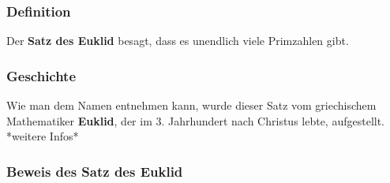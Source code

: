 \subsubsection{Definition}
Der \textbf{Satz des Euklid} besagt, dass es unendlich viele Primzahlen gibt.
\subsubsection{Geschichte}
Wie man dem Namen entnehmen kann, wurde dieser Satz vom griechischem Mathematiker \textbf{Euklid}, der im 3. Jahrhundert nach Christus lebte, aufgestellt.
*weitere Infos*
\subsubsection{Beweis des Satz des Euklid}
